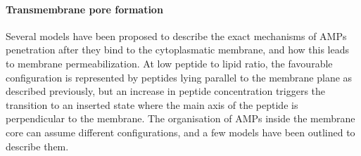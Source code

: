 \documentclass[a4paper,11pt]{extreport}
\begin{document}
\paragraph{Transmembrane pore formation} Several models have been proposed to describe the exact mechanisms of AMPs penetration after they bind to the cytoplasmatic membrane, and how this leads to membrane permeabilization.\cite{Brogden2005,Toke2005,Nguyen2011}
%
At low peptide to lipid ratio, the favourable configuration is represented by peptides lying parallel to the membrane plane as described previously,\cite{Yang2001} but an increase in peptide concentration triggers the transition to an inserted state where the main axis of the peptide is perpendicular to the membrane. The organisation of AMPs inside the membrane core can assume different configurations, and a few models have been outlined to describe them.
\end{document}
